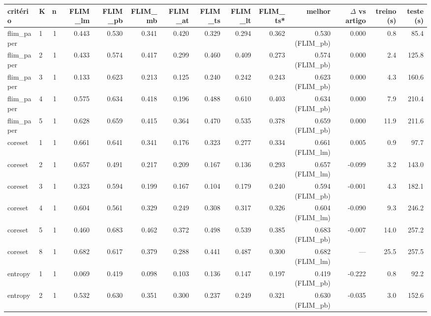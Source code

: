 \begin{tabular}{llrrrrrrrrrrrr}
\hline
critério & K & n & FLIM\_lm & FLIM\_pb & FLIM\_mb & FLIM\_at & FLIM\_ts & FLIM\_lt & FLIM\_ts* & melhor & $\Delta$ vs artigo & treino (s) & teste (s) \\
\hline
flim\_paper & 1 & 1 & 0.443 & 0.530 & 0.341 & 0.420 & 0.329 & 0.294 & 0.362 & 0.530 (FLIM\_pb) & 0.000 & 0.8 & 85.4 \\
flim\_paper & 2 & 1 & 0.433 & 0.574 & 0.417 & 0.299 & 0.460 & 0.409 & 0.273 & 0.574 (FLIM\_pb) & 0.000 & 2.4 & 125.8 \\
flim\_paper & 3 & 1 & 0.133 & 0.623 & 0.213 & 0.125 & 0.240 & 0.242 & 0.243 & 0.623 (FLIM\_pb) & 0.000 & 4.3 & 160.6 \\
flim\_paper & 4 & 1 & 0.575 & 0.634 & 0.418 & 0.196 & 0.488 & 0.610 & 0.403 & 0.634 (FLIM\_pb) & 0.000 & 7.9 & 210.4 \\
flim\_paper & 5 & 1 & 0.628 & 0.659 & 0.415 & 0.364 & 0.470 & 0.535 & 0.378 & 0.659 (FLIM\_pb) & 0.000 & 11.9 & 211.6 \\
coreset & 1 & 1 & 0.661 & 0.641 & 0.341 & 0.176 & 0.323 & 0.277 & 0.334 & 0.661 (FLIM\_lm) & 0.005 & 0.9 & 97.7 \\
coreset & 2 & 1 & 0.657 & 0.491 & 0.217 & 0.209 & 0.167 & 0.136 & 0.293 & 0.657 (FLIM\_lm) & -0.099 & 3.2 & 143.0 \\
coreset & 3 & 1 & 0.323 & 0.594 & 0.199 & 0.167 & 0.104 & 0.179 & 0.240 & 0.594 (FLIM\_pb) & -0.001 & 4.3 & 182.1 \\
coreset & 4 & 1 & 0.604 & 0.561 & 0.329 & 0.249 & 0.308 & 0.317 & 0.326 & 0.604 (FLIM\_lm) & -0.090 & 9.3 & 246.2 \\
coreset & 5 & 1 & 0.460 & 0.683 & 0.462 & 0.372 & 0.498 & 0.539 & 0.385 & 0.683 (FLIM\_pb) & -0.007 & 14.0 & 257.2 \\
coreset & 8 & 1 & 0.682 & 0.617 & 0.379 & 0.288 & 0.441 & 0.487 & 0.300 & 0.682 (FLIM\_lm) & --- & 25.5 & 257.5 \\
entropy & 1 & 1 & 0.069 & 0.419 & 0.098 & 0.103 & 0.136 & 0.147 & 0.197 & 0.419 (FLIM\_pb) & -0.222 & 0.8 & 92.2 \\
entropy & 2 & 1 & 0.532 & 0.630 & 0.351 & 0.300 & 0.237 & 0.249 & 0.321 & 0.630 (FLIM\_pb) & -0.035 & 3.0 & 152.6 \\

\end{tabular}
